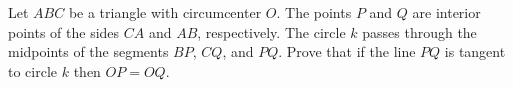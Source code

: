 Let $ABC$ be a triangle with circumcenter $O$. The points $P$ and $Q$ are interior points of the sides $CA$ and $AB$, respectively. The circle $k$ passes through the midpoints of the segments $BP$, $CQ$, and $PQ$. Prove that if the line $PQ$ is tangent to circle $k$ then $OP = OQ$.
